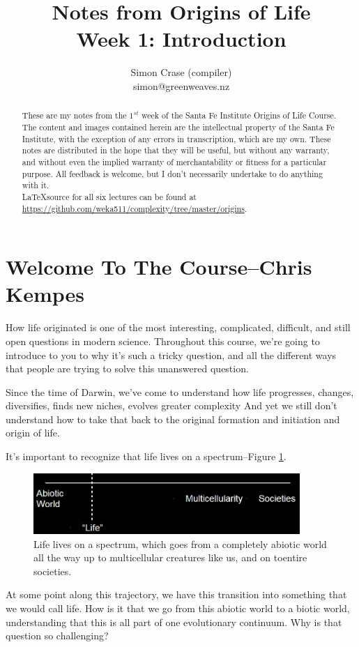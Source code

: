 \documentclass[]{article}
\title{
	Notes from Origins of Life\\
	Week 1: Introduction
}
\author{Simon Crase (compiler)\\simon@greenweaves.nz}
\begin{document}
\maketitle

\begin{abstract}
    These are my notes from the $1^{st}$ week of the Santa Fe Institute Origins of Life Course\cite{sfi2020}.\\
    The content and images contained herein are the intellectual property of the Santa Fe Institute, with the exception of any errors in transcription, which are my own.
    These notes are distributed in the hope that they will be useful, but without any warranty, and without even the implied warranty of  merchantability or fitness for a particular purpose. All feedback is welcome,  but I don't necessarily undertake to do anything with it.\\
    \LaTeX source for all six lectures can be found at\\
    \url{https://github.com/weka511/complexity/tree/master/origins}.
\end{abstract}

\setcounter{tocdepth}{2}
\tableofcontents
\listoffigures

\section[Welcome To The Course]{Welcome To The Course--Chris Kempes}

How life originated is one of the most interesting, complicated, difficult, and still open questions in modern science. Throughout this course, we're going to
introduce to you to why it's such a tricky question, and all the different ways that people are trying to solve this unanswered question.	

Since the time of Darwin, we've come to understand how life progresses, changes, diversifies, finds new niches, evolves greater complexity And yet we still don't understand how to take that back to the original formation and initiation and origin of life.

It's important to recognize that life lives on a spectrum--Figure \ref{fig:lifesTransitions}.

\begin{figure}[H]
	\caption[Life lives on a spectrum]{Life lives on a spectrum, which goes from a completely abiotic world
		all the way up to multicellular creatures like us, and on toentire societies.}\label{fig:lifesTransitions}
	\includegraphics[width=0.9\textwidth]{lifesTransitions}
\end{figure}
At some point along this trajectory, we have this transition into something
that we would call life. How is it that we go from this
abiotic world to a biotic world, understanding that this is all part of one
evolutionary continuum. Why is that question so challenging?
\end{document}
